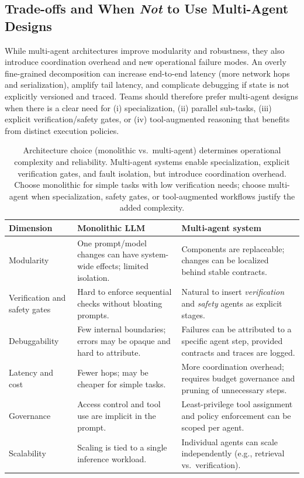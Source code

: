 \subsection*{Trade-offs and When \emph{Not} to Use Multi-Agent Designs}
While multi-agent architectures improve modularity and robustness, they also introduce coordination overhead and new operational failure modes.
An overly fine-grained decomposition can increase end-to-end latency (more network hops and serialization), amplify tail latency, and complicate debugging if state is not explicitly versioned and traced.
Teams should therefore prefer multi-agent designs when there is a clear need for (i) specialization, (ii) parallel sub-tasks, (iii) explicit verification/safety gates, or (iv) tool-augmented reasoning that benefits from distinct execution policies.

\begin{table}[t]
\centering
\small
\caption{Architecture choice (monolithic vs.\ multi-agent) determines operational complexity and reliability. Multi-agent systems enable specialization, explicit verification gates, and fault isolation, but introduce coordination overhead. Choose monolithic for simple tasks with low verification needs; choose multi-agent when specialization, safety gates, or tool-augmented workflows justify the added complexity.}
\label{tab:ch09_monolithic_vs_multiagent}
\setlength{\tabcolsep}{6pt}
\renewcommand{\arraystretch}{1.3}
\begin{tabularx}{\linewidth}{@{}p{3.3cm}X X@{}}
\toprule
\rowcolor{gray!15}
\textbf{Dimension} & \textbf{Monolithic LLM} & \textbf{Multi-agent system} \\
\midrule
Modularity & One prompt/model changes can have system-wide effects; limited isolation. & Components are replaceable; changes can be localized behind stable contracts. \\
Verification and safety gates & Hard to enforce sequential checks without bloating prompts. & Natural to insert \emph{verification} and \emph{safety} agents as explicit stages. \\
Debuggability & Few internal boundaries; errors may be opaque and hard to attribute. & Failures can be attributed to a specific agent step, provided contracts and traces are logged. \\
Latency and cost & Fewer hops; may be cheaper for simple tasks. & More coordination overhead; requires budget governance and pruning of unnecessary steps. \\
Governance & Access control and tool use are implicit in the prompt. & Least-privilege tool assignment and policy enforcement can be scoped per agent. \\
Scalability & Scaling is tied to a single inference workload. & Individual agents can scale independently (e.g., retrieval vs.\ verification). \\
\bottomrule
\end{tabularx}
\end{table}


